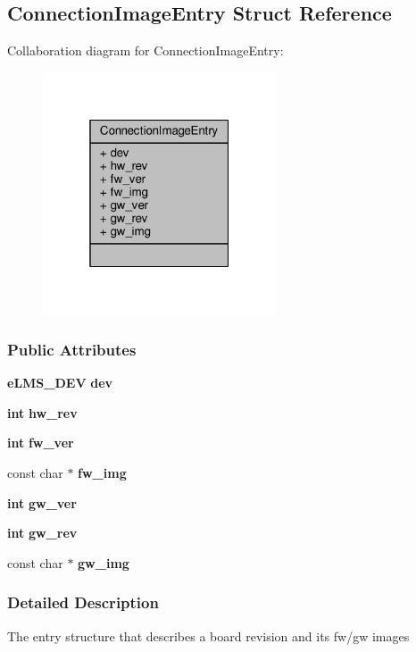 \subsection{Connection\+Image\+Entry Struct Reference}
\label{structConnectionImageEntry}


Collaboration diagram for Connection\+Image\+Entry\+:
\nopagebreak
\begin{figure}[H]
\begin{center}
\leavevmode
\includegraphics[width=196pt]{de/d07/structConnectionImageEntry__coll__graph}
\end{center}
\end{figure}
\subsubsection*{Public Attributes}
\begin{DoxyCompactItemize}
\item 
{\bf e\+L\+M\+S\+\_\+\+D\+EV} {\bf dev}
\item 
{\bf int} {\bf hw\+\_\+rev}
\item 
{\bf int} {\bf fw\+\_\+ver}
\item 
const char $\ast$ {\bf fw\+\_\+img}
\item 
{\bf int} {\bf gw\+\_\+ver}
\item 
{\bf int} {\bf gw\+\_\+rev}
\item 
const char $\ast$ {\bf gw\+\_\+img}
\end{DoxyCompactItemize}


\subsubsection{Detailed Description}
The entry structure that describes a board revision and its fw/gw images 

